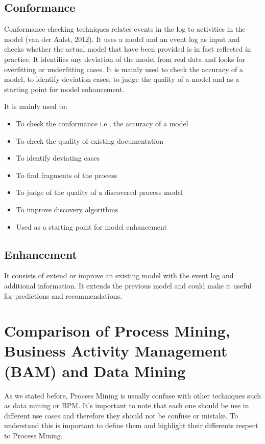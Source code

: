 \documentclass[conference]{IEEEtran}
\begin{document}
\subsection{Conformance}

Conformance checking techniques relates events in the log to activities in the model  (van der Aalst, 2012). It uses a model and an event log as input and checks whether the actual model that have been provided is in fact reflected in practice. It identifies any deviation of the model from real data and looks for overfitting or underfitting cases. It is mainly used to check the accuracy of a model, to identify deviation cases, to judge the quality of a model and as a starting point for model enhancement.

It is mainly used to:
 \begin{itemize}
    \item To check the conformance i.e., the accuracy of a model
    \item To check the quality of existing documentation
    \item To identify deviating cases
    \item To find fragments of the process
    \item To judge of the quality of a discovered process model
    \item To improve discovery algorithms
    \item Used as a starting point for model enhancement
\end{itemize}

\subsection{Enhancement}

It consists of extend or improve an existing model with the event log and additional information. It extends the previous model and could make it useful for predictions and recommendations.

\section{Comparison of Process Mining, Business Activity Management (BAM) and Data Mining}
As we stated before, Process Mining is usually confuse with other techniques such as data mining or BPM. It's important to note that each one should be use in different use cases and therefore they should not be confuse or mistake.
To understand this is important to define them and highlight their differents respect to Process Mining.
\end{document}
